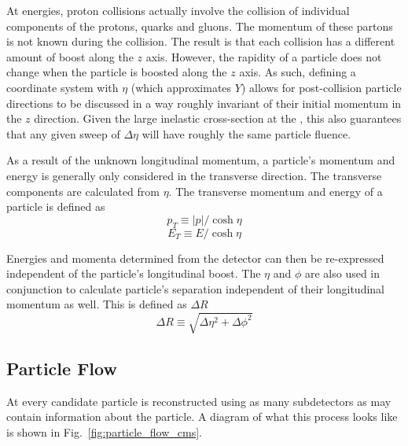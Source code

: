 At \LHC energies, proton collisions actually involve the collision of individual components of the protons, quarks and gluons.  The momentum of these partons is not known during the collision.  The result is that each collision has a different amount of boost along the \ensuremath{z} axis.  
However, the rapidity of a particle does not change when the particle is boosted along the \ensuremath{z} axis.  As such, defining a coordinate system with \ensuremath{\eta} (which approximates \ensuremath{Y}) allows for post-collision particle directions to be discussed in a way roughly invariant of their initial momentum in the \ensuremath{z} direction.  Given the large inelastic cross-section at the \LHC, this also guarantees that any given sweep of \ensuremath{\Delta \eta} will have roughly the same particle fluence.

As a result of the unknown longitudinal momentum, a particle's momentum and energy is generally only considered in the transverse direction.  The transverse components are calculated from \ensuremath{\eta}.  The transverse momentum and energy of a particle is defined as
\begin{equation}
    p_T \equiv |p| / \cosh{\eta} 
    \label{eq:pT}
\end{equation}{}
\begin{equation}
    E_T \equiv E / \cosh{\eta} 
    \label{eq:Et}
\end{equation}{}

Energies and momenta determined from the detector can then be re-expressed independent of the particle's longitudinal boost. The \ensuremath{\eta} and \ensuremath{\phi} are also used in conjunction to calculate particle's separation independent of their longitudinal momentum as well.  This is defined as \ensuremath{\Delta R}
\begin{equation}
    \Delta R \equiv \sqrt{\Delta\eta^2 + \Delta\phi^2} 
    \label{eq:dR}
\end{equation}
\subsection{Particle Flow}
\label{sec:particle_flow}
At \CMS every candidate particle is reconstructed using as many subdetectors as may contain information about the particle. A diagram of what this process looks like is shown in Fig.~\ref{fig:particle_flow_cms}.

